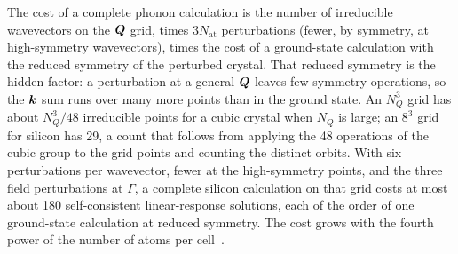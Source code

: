 The cost of a complete phonon calculation is the number of irreducible wavevectors on the $\bm{Q}$ grid, times $3N_{\mathrm{at}}$ perturbations (fewer, by symmetry, at high-symmetry wavevectors), times the cost of a ground-state calculation with the reduced symmetry of the perturbed crystal. That reduced symmetry is the hidden factor: a perturbation at a general $\bm{Q}$ leaves few symmetry operations, so the $\bm{k}$ sum runs over many more points than in the ground state. An $N_Q^3$ grid has about $N_Q^3/48$ irreducible points for a cubic crystal when $N_Q$ is large; an $8^3$ grid for silicon has 29, a count that follows from applying the 48 operations of the cubic group to the grid points and counting the distinct orbits. With six perturbations per wavevector, fewer at the high-symmetry points, and the three field perturbations at $\Gamma$, a complete silicon calculation on that grid costs at most about 180 self-consistent linear-response solutions, each of the order of one ground-state calculation at reduced symmetry. The cost grows with the fourth power of the number of atoms per cell~\cite[Sect.~IV.B]{baroni2001phonons}.

